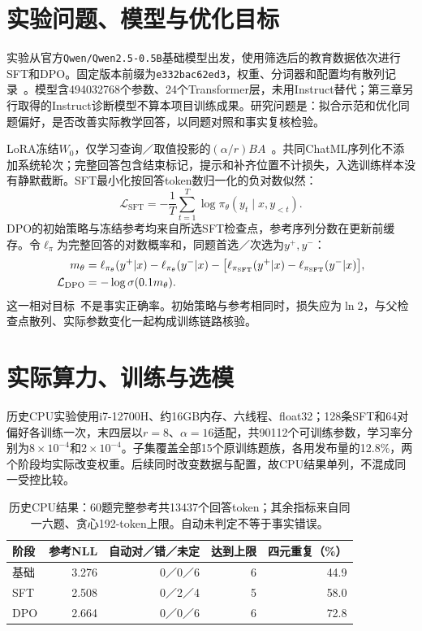 \section{实验问题、模型与优化目标}
实验从官方\texttt{Qwen/Qwen2.5-0.5B}基础模型出发，使用筛选后的教育数据依次进行SFT和DPO。固定版本前缀为\texttt{e332bac62ed3}，权重、分词器和配置均有散列记录~\cite{qwenbase}。模型含494032768个参数、24个Transformer层，未用Instruct替代；第三章另行取得的Instruct诊断模型不算本项目训练成果。研究问题是：拟合示范和优化同题偏好，是否改善实际教学回答，以同题对照和事实复核检验。

LoRA冻结$W_0$，仅学习查询／取值投影的$(\alpha/r)BA$~\cite{lora}。共同ChatML序列化不添加系统轮次；完整回答包含结束标记，提示和补齐位置不计损失，入选训练样本没有静默截断。SFT最小化按回答token数归一化的负对数似然：
\begin{equation}
\mathcal L_{\mathrm{SFT}}=-\frac1T\sum_{t=1}^T\log\pi_\theta(y_t\mid x,y_{<t}).
\label{eq:training-sft}
\end{equation}
DPO的初始策略与冻结参考均来自所选SFT检查点，参考序列分数在更新前缓存。令$\ell_\pi$为完整回答的对数概率和，同题首选／次选为$y^+,y^-$：
\begin{align}
m_\theta&=\ell_{\pi_\theta}(y^+|x)-\ell_{\pi_\theta}(y^-|x)
-\bigl[\ell_{\pi_{\rm SFT}}(y^+|x)-\ell_{\pi_{\rm SFT}}(y^-|x)\bigr],\\
\mathcal L_{\mathrm{DPO}}&=-\log\sigma(0.1m_\theta).
\label{eq:training-dpo}
\end{align}
这一相对目标~\cite{dpo}不是事实正确率。初始策略与参考相同时，损失应为$\ln2$，与父检查点散列、实际参数变化一起构成训练链路核验。

\section{实际算力、训练与选模}
历史CPU实验使用i7-12700H、约16GB内存、六线程、float32；128条SFT和64对偏好各训练一次，末四层以$r=8$、$\alpha=16$适配，共90112个可训练参数，学习率分别为$8\times10^{-4}$和$2\times10^{-4}$。子集覆盖全部15个原训练题族，各用发布量的12.8\%，两个阶段均实际改变权重。后续同时改变数据与配置，故CPU结果单列，不混成同一受控比较。

\begin{table}[H]\centering\small
\caption{历史CPU结果：60题完整参考共13437个回答token；其余指标来自同一六题、贪心192-token上限。自动未判定不等于事实错误。}\label{tab:training-cpu}
\begin{tabularx}{\linewidth}{@{}Yrrrr@{}}\toprule
阶段 & 参考NLL & 自动对／错／未定 & 达到上限 & 四元重复（\%）\\\midrule
基础 & 3.276 & 0／0／6 & 6 & 44.9\\
SFT & 2.508 & 0／2／4 & 5 & 58.0\\
DPO & 2.664 & 0／0／6 & 6 & 72.8\\\bottomrule
\end{tabularx}
\end{table}\FloatBarrier

